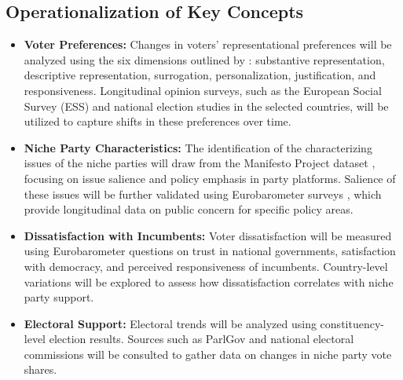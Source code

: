 \subsection*{Operationalization of Key Concepts}
\begin{itemize}
	\item \textbf{Voter Preferences:}
	      Changes in voters’ representational preferences will be analyzed using the six dimensions outlined by \textcite{blumenau2024}: substantive representation, descriptive representation, surrogation, personalization, justification, and responsiveness. Longitudinal opinion surveys, such as the European Social Survey (ESS) \parencite*{ess2023} and national election studies in the selected countries, will be utilized to capture shifts in these preferences over time.

	\item \textbf{Niche Party Characteristics:}
	      The identification of the characterizing issues of the niche parties will draw from the Manifesto Project dataset \parencite*[]{manifestoproject}, focusing on issue salience and policy emphasis in party platforms. Salience of these issues will be further validated using Eurobarometer surveys \parencite*{eurobarometer2023}, which provide longitudinal data on public concern for specific policy areas.

	\item \textbf{Dissatisfaction with Incumbents:}
	      Voter dissatisfaction will be measured using Eurobarometer \parencite*{eurobarometer2023} questions on trust in national governments, satisfaction with democracy, and perceived responsiveness of incumbents. Country-level variations will be explored to assess how dissatisfaction correlates with niche party support.

	\item \textbf{Electoral Support:}
	      Electoral trends will be analyzed using constituency-level election results. Sources such as ParlGov \parencite*{parlgov2019} and national electoral commissions will be consulted to gather data on changes in niche party vote shares.
\end{itemize}

